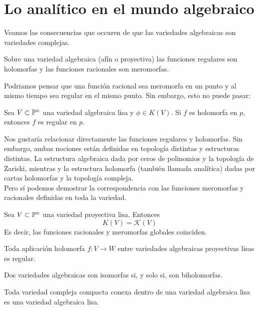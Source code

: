 \section{Lo analítico en el mundo algebraico}

Veamos las consecuencias que occuren de que las variedades algebraicas son variedades complejas.

\begin{example}
    Sobre una variedad algebraica (afín o proyectiva) las funciones regulares son holomorfas y las funciones racionales son meromorfas.
\end{example}

Podriamos pensar que una función racional sea meromorfa en un punto y al mismo tiempo sea regular en el mismo punto. Sin embargo, esto no puede pasar:
\begin{theorem}
    Sea $V\subset\mathbb{P}^n$ una variedad algebraica lisa y $\phi\in K(V)$. Si $f$ es holomorfa en $p$, entonces $f$ es regular en $p$.
\end{theorem}

Nos gustaría relacionar directamente las funciones regulares y holomorfas. Sin embargo, ambas nociones están definidas en topología distintas y estructuras distintas. La estructura algebraica dada por ceros de polinomios y la topología de Zariski, mientras y la estructura holomorfa (también llamada analítica) dadas por cartas holomorfas y la topología compleja. \\
Pero sí podemos demostrar la correspondencia con las funciones meromorfas y racionales definidas en toda la variedad. 

\begin{theorem}
    Sea $V\subset\mathbb{P}^n$ una variedad proyectiva lisa. Entonces 
    \begin{equation*}
        K(V)=\mathcal{K}(V)
    \end{equation*}
    Es decir, las funciones racionales y meromorfas globales coinciden.
\end{theorem}

\begin{propo}
    Toda aplicación holomorfa $f:V\to W$ entre variedades algebraicas proyectivas lisas es regular.
\end{propo}

\begin{propo}
    Dos variedades algebraicas son isomorfas si, y  solo si, son biholomorfas.
\end{propo}

\begin{theorem}
    Toda variedad compleja compacta conexa dentro de una variedad algebraica lisa es una variedad algebraica lisa.
\end{theorem}